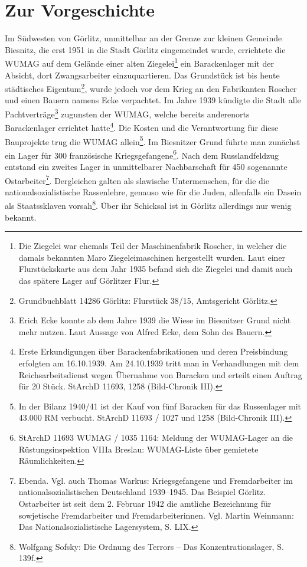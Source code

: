 \documentclass[a4paper,12pt,ngerman,
]{nisebook}
\begin{document}
\section{Zur Vorgeschichte}
Im Südwesten von Görlitz, unmittelbar an der Grenze zur kleinen Gemeinde Biesnitz, die erst 1951 in die Stadt Görlitz eingemeindet wurde, errichtete die WUMAG auf dem Gelände einer alten Ziegelei\footnote{Die Ziegelei war ehemals Teil der Maschinenfabrik Roscher, in welcher die damals bekannten Maro Ziegeleimaschinen hergestellt wurden. Laut einer Flurstückskarte aus dem Jahr 1935 befand sich die Ziegelei und damit auch das spätere Lager auf Görlitzer Flur.} ein Barackenlager mit der Absicht, dort Zwangsarbeiter einzuquartieren. Das Grundstück ist bis heute städtisches Eigentum\footnote{Grundbuchblatt 14286 Görlitz: Flurstück 38/15, Amtsgericht Görlitz.}, wurde jedoch vor dem Krieg an den Fabrikanten Roscher und einen Bauern namens Ecke verpachtet.
Im Jahre 1939 kündigte die Stadt alle Pachtverträge\footnote{Erich Ecke konnte ab dem Jahre 1939 die Wiese im Biesnitzer Grund nicht mehr nutzen. Laut Aussage von Alfred Ecke, dem Sohn des Bauern.} zugunsten der WUMAG, welche bereits anderenorts Barackenlager errichtet hatte\footnote{Erste Erkundigungen über Barackenfabrikationen und deren Preisbindung erfolgten am 16.10.1939. Am 24.10.1939 tritt man in Verhandlungen mit dem Reichsarbeitsdienst wegen Übernahme von Baracken und erteilt einen Auftrag für 20 Stück. StArchD 11693, 1258 (Bild-Chronik III).}. Die Kosten und die Verantwortung für diese Bauprojekte trug die WUMAG allein\footnote{In der Bilanz 1940/41 ist der Kauf von fünf Baracken für das Russenlager mit 43.000 RM verbucht. StArchD 11693 / 1027 und 1258 (Bild-Chronik III).}. Im Biesnitzer Grund führte man zunächst ein Lager für 300 französische Kriegsgefangene\footnote{StArchD 11693 WUMAG / 1035 1164: Meldung der WUMAG-Lager an die Rüstungsinspektion VIIIa Breslau: WUMAG-Liste über gemietete Räumlichkeiten.}.
Nach dem Russlandfeldzug entstand ein zweites Lager in unmittelbarer Nachbarschaft für 450 sogenannte \glqq Ostarbeiter\grqq\footnote{Ebenda. Vgl. auch Thomas Warkus: Kriegsgefangene und Fremdarbeiter im nationalsozialistischen Deutschland 1939--1945. Das Beispiel Görlitz. Ostarbeiter ist seit dem 2. Februar 1942 die amtliche Bezeichnung für sowjetische Fremdarbeiter und Fremdarbeiterinnen. Vgl. Martin Weinmann: Das Nationalsozialistische Lagersystem, S. LIX.}. Dergleichen galten als slawische Untermenschen, für die die nationalsozialistische Rassenlehre, genauso wie für die Juden, allenfalls ein Dasein als Staatssklaven vorsah\footnote{Wolfgang Sofsky: Die Ordnung des Terrors -- Das Konzentrationslager, S. 139f.}. Über ihr Schicksal ist in Görlitz allerdings nur wenig bekannt.
\end{document}
